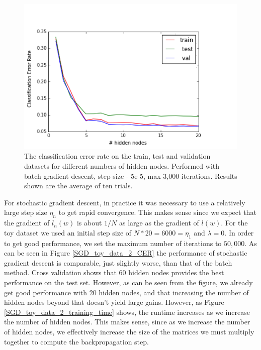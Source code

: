 \documentclass[10pt]{article}
\begin{document}
%
\begin{figure}
\centering
\includegraphics[scale=0.8]{batch_toydataset2.png}
\caption{The classification error rate on the train, test and validation datasets for different numbers of hidden nodes.  Performed with batch gradient descent, step size - 5e-5, max 3,000 iterations.  Results shown are the average of ten trials.}
\label{batch_toydataset2}
\end{figure}
%
For stochastic gradient descent, in practice it was necessary to use a relatively large step size $\eta_n$ to get rapid convergence. This makes sense since we expect that the gradient of $l_n(w)$ is about $1/N$ as large as the gradient of $l(w)$. For the toy dataset we used an initial step size of $N*20 = 6000 = \eta_1$ and $\lambda = 0$. In order to get good performance, we set the maximum number of iterations to $50,000$. As can be seen in Figure \ref{SGD_toy_data_2_CER} the performance of stochastic gradient descent is comparable, just slightly worse, than that of the batch method. Cross validation shows that 60 hidden nodes provides the best performance on the test set. However, as can be seen from the figure, we already get good performance with 20 hidden nodes, and that increasing the number of hidden nodes beyond that doesn't yield large gains. However, as Figure \ref{SGD_toy_data_2_training_time} shows, the runtime increases as we increase the number of hidden nodes. This makes sense, since as we increase the number of hidden nodes, we effectively increase the size of the matrices we must multiply together to compute the backpropagation step.
\end{document}
